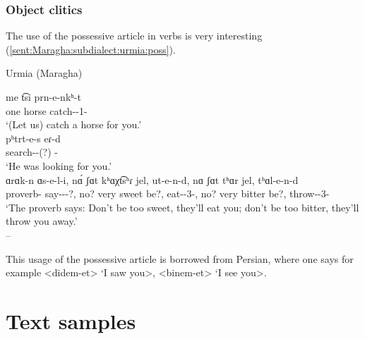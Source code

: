 \subsubsection{Object clitics}

The use of the possessive article in verbs is very interesting (\ref{sent:Maragha:subdialect:urmia:poss}).

\begin{exe}
	\ex Urmia (Maragha)
	\label{sent:Maragha:subdialect:urmia:poss}
	\begin{xlist}
		\ex \gll me t͡si prn-e-nkʰ-t \\
		one horse catch-{\thgloss}-1{\pl}-{\possSsg} \\
		\trans `(Let us) catch a horse for you.' \\
		\ex \gll pʰtrt-e-s eɾ-d\\
		search-{\thgloss}-{\impfcvb}(?) {\pst}-{\possSsg} \\
		\trans `He was looking for you.' \\
		\ex \gll ɑrɑk-n ɑs-e-l-i, n\'ɑ ʃɑt kʰɑχt͡sʰɾ jel, ut-e-n-d, nɑ ʃɑt tʰɑr jel, tʰɑl-e-n-d \\
		proverb-{} say-{\thgloss}-{\infgloss}-?, no? very sweet be?, eat-{\thgloss}-3{\pl}-{\possSsg}, no? very bitter be?, throw-{\thgloss}-3{\pl}-{\possSsg}\\
		\trans `The proverb says: Don't be too sweet, they'll eat you; don't be too bitter, they'll throw you away.'\\
		 -- 
		
	\end{xlist}
\end{exe}

This usage of the possessive article is borrowed from Persian, where one says for example <didem-et> `I saw you>, <binem-et> `I see you>. 

 


\section{Text samples}

{\sampleoverview}

